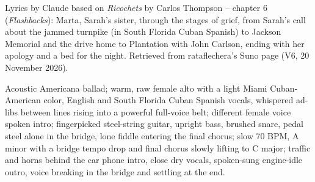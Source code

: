 
\begin{notes}
Lyrics by Claude based on \emph{Ricochets} by Carlos Thompson -- chapter 6 (\emph{Flashbacks}): Marta, Sarah's sister, through the stages of grief, from Sarah's call about the jammed turnpike (in South Florida Cuban Spanish) to Jackson Memorial and the drive home to Plantation with John Carlson, ending with her apology and a bed for the night. Retrieved from rataflechera's Suno page (V6, 20 November 2026).
\end{notes}
\begin{style}
Acoustic Americana ballad; warm, raw female alto with a light Miami Cuban-American color, English and South Florida Cuban Spanish vocals, whispered ad-libs between lines rising into a powerful full-voice belt; different female voice spoken intro; fingerpicked steel-string guitar, upright bass, brushed snare, pedal steel alone in the bridge, lone fiddle entering the final chorus; slow 70 BPM, A minor with a bridge tempo drop and final chorus slowly lifting to C major; traffic and horns behind the car phone intro, close dry vocals, spoken-sung engine-idle outro, voice breaking in the bridge and settling at the end.
\end{style}
